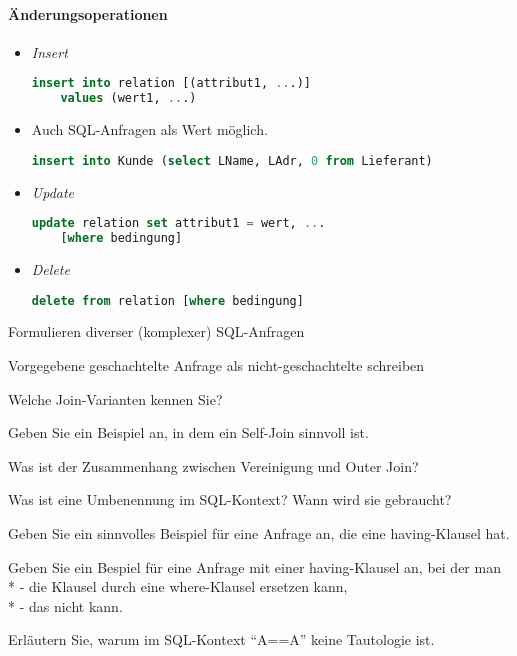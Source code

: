 \paragraph{Änderungsoperationen}
\begin{itemize}
	\item \emph{Insert}
	\begin{lstlisting}[language=sql]
insert into relation [(attribut1, ...)]
	values (wert1, ...)
	\end{lstlisting}
	
	\item Auch SQL-Anfragen als Wert möglich.
	\begin{lstlisting}[language=sql]
insert into Kunde (select LName, LAdr, 0 from Lieferant)
	\end{lstlisting}
	
	\item \emph{Update}
	\begin{lstlisting}[language=sql]
update relation set attribut1 = wert, ... 
	[where bedingung]
	\end{lstlisting}
	
	\item \emph{Delete}
	\begin{lstlisting}[language=sql]
delete from relation [where bedingung]
	\end{lstlisting}
\end{itemize}

\begin{fragen}
	\item Formulieren diverser (komplexer) SQL-Anfragen
	\item Vorgegebene geschachtelte Anfrage als nicht-geschachtelte schreiben
	\item Welche Join-Varianten kennen Sie?
	\item Geben Sie ein Beispiel an, in dem ein Self-Join sinnvoll ist.
	\item Was ist der Zusammenhang zwischen Vereinigung und Outer Join?
	\item Was ist eine Umbenennung im SQL-Kontext? Wann wird sie gebraucht?
	\item Geben Sie ein sinnvolles Beispiel für eine Anfrage an, die eine having-Klausel hat.
	\item Geben Sie ein Bespiel für eine Anfrage mit einer having-Klausel an, bei der man \\*
		- die Klausel durch eine where-Klausel ersetzen kann, \\*
		- das nicht kann.
	\item Erläutern Sie, warum im SQL-Kontext ``A==A'' keine Tautologie ist.
\end{fragen}